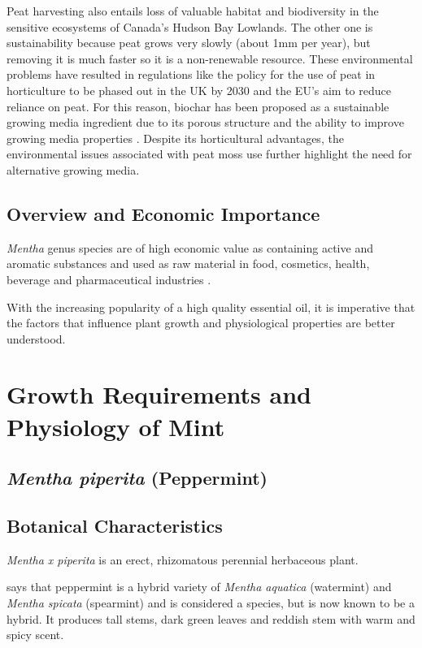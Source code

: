 Peat harvesting also entails loss of valuable habitat and biodiversity in the sensitive ecosystems of Canada's Hudson Bay Lowlands. The other one is sustainability because peat grows very slowly (about 1mm per year), but removing it is much faster so it is a non-renewable resource. These environmental problems have resulted in regulations like the policy for the use of peat in horticulture to be phased out in the UK by 2030 and the EU's aim to reduce reliance on peat. For this reason, biochar has been proposed as a sustainable growing media ingredient due to its porous structure and the ability to improve growing media properties \parencite{Dumroese2018}. Despite its horticultural advantages, the environmental issues associated with peat moss use further highlight the need for alternative growing media.

\subsection{Overview and Economic Importance}

\textit{Mentha} genus species are of high economic value as containing active and aromatic substances and used as raw material in food, cosmetics, health, beverage and pharmaceutical industries \parencite{yaghobvand2022evaluation}.

With the increasing popularity of a high quality essential oil, it is imperative that the factors that influence plant growth and physiological properties are better understood.

\section{Growth Requirements and Physiology of Mint}

\subsection{\textit{Mentha piperita} (Peppermint)}

\subsection*{Botanical Characteristics}

\textit{Mentha x piperita} is an erect, rhizomatous perennial herbaceous plant.

\textcite{rhs2026mentha} says that peppermint is a hybrid variety of \textit{Mentha aquatica} (watermint) and \textit{Mentha spicata} (spearmint) and is considered a species, but is now known to be a hybrid. It produces tall stems, dark green leaves and reddish stem with warm and spicy scent.

